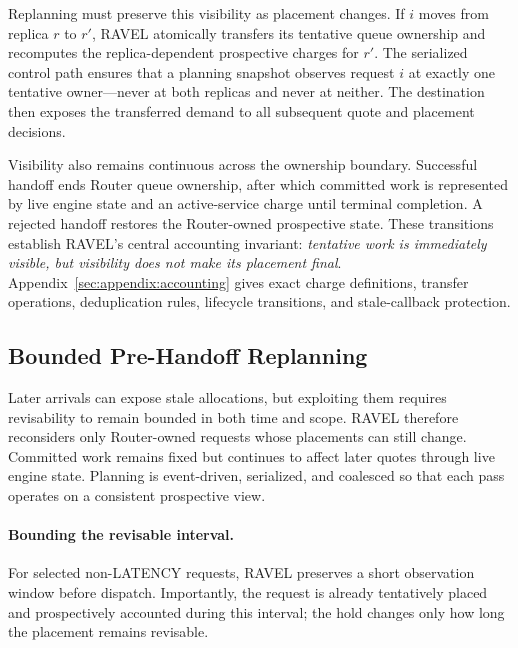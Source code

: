 \documentclass[letterpaper,twocolumn,10pt]{article}
\begin{document}
Replanning must preserve this visibility as placement changes.
If $i$ moves from replica $r$ to $r'$, RAVEL atomically transfers its tentative
queue ownership and recomputes the replica-dependent prospective charges for
$r'$.
The serialized control path ensures that a planning snapshot observes
request $i$ at exactly one tentative owner---never at both replicas and never
at neither.
The destination then exposes the transferred demand to all subsequent quote
and placement decisions.

Visibility also remains continuous across the ownership boundary.
Successful handoff ends Router queue ownership, after which committed work is
represented by live engine state and an active-service charge until terminal
completion.
A rejected handoff restores the Router-owned prospective state.
These transitions establish RAVEL's central accounting invariant:
\emph{tentative work is immediately visible, but visibility does not make its
placement final}.
Appendix~\ref{sec:appendix:accounting} gives exact charge definitions, transfer
operations, deduplication rules, lifecycle transitions, and stale-callback
protection.


\subsection{Bounded Pre-Handoff Replanning}
\label{sec:design:replanning}

Later arrivals can expose stale allocations, but exploiting them requires
revisability to remain bounded in both time and scope.
RAVEL therefore reconsiders only Router-owned requests whose placements can
still change.
Committed work remains fixed but continues to affect later quotes through live
engine state.
Planning is event-driven, serialized, and coalesced so that each pass operates
on a consistent prospective view.

\paragraph{Bounding the revisable interval.}
For selected non-LATENCY requests, RAVEL preserves a short observation window
before dispatch.
Importantly, the request is already tentatively placed and prospectively
accounted during this interval; the hold changes only how long the placement
remains revisable.
\end{document}
